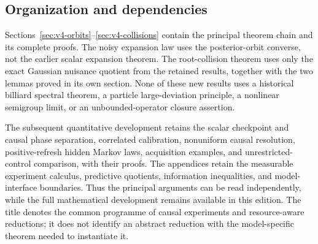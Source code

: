 \subsection{Organization and dependencies}
Sections~\ref{sec:v4-orbits}--\ref{sec:v4-collisions} contain the
principal theorem chain and its complete proofs. The noisy expansion
law uses the posterior-orbit converse, not the earlier scalar
expansion theorem. The root-collision theorem uses only the exact
Gaussian nuisance quotient from the retained results, together with
the two lemmas proved in its own section. None of these new results
uses a historical billiard spectral theorem, a particle large-deviation
principle, a nonlinear semigroup limit, or an unbounded-operator
closure assertion.

The subsequent quantitative development retains the scalar checkpoint
and causal phase separation, correlated calibration, nonuniform
causal resolution, positive-refresh hidden Markov laws, acquisition
examples, and unrestricted-control comparison, with their proofs.
The appendices retain the measurable experiment calculus, predictive
quotients, information inequalities, and model-interface boundaries.
Thus the principal arguments can be read independently, while the
full mathematical development remains available in this edition.
The title denotes the common programme of causal experiments and
resource-aware reductions; it does not identify an abstract reduction
with the model-specific theorem needed to instantiate it.
